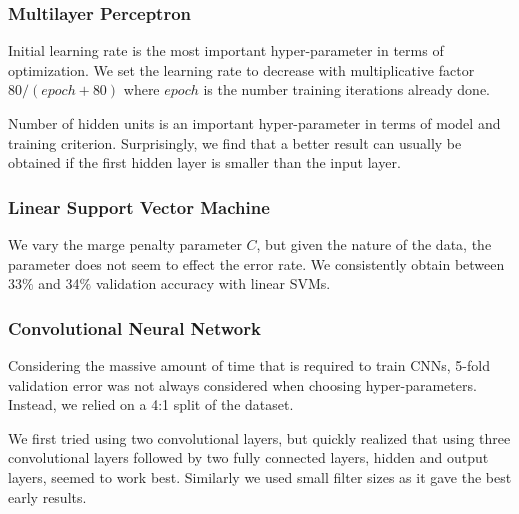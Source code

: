 \documentclass{acm_proc_article-sp}
\begin{document}
\subsubsection{Multilayer Perceptron}
Initial learning rate is the most important hyper-parameter in terms of optimization. We set the learning rate to decrease with multiplicative factor $80/(epoch+80)$ where $epoch$ is the number training iterations already done. 

Number of hidden units is an important hyper-parameter in terms of model and training criterion. Surprisingly, we find that a better result can usually be obtained if the first hidden layer is smaller than the input layer.

\subsubsection{Linear Support Vector Machine }
We vary the marge penalty parameter $C$, but given the nature of the data, the parameter does not seem to effect the error rate. We consistently obtain between 33$\%$ and 34$\%$ validation accuracy with linear SVMs.

\subsubsection{Convolutional Neural Network}
Considering the massive amount of time that is required to train CNNs, 5-fold validation error was not always considered when choosing hyper-parameters. Instead, we relied on a 4:1 split of the dataset. 

We first tried using two convolutional layers, but quickly realized that using three convolutional layers followed by two fully connected layers, hidden and output layers, seemed to work best. Similarly we used small filter sizes as it gave the best early results. 
\end{document}
